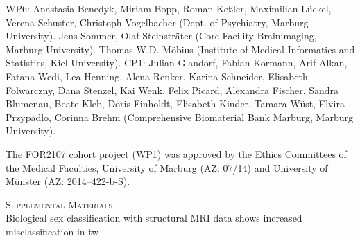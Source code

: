 \documentclass{article}
\begin{document}
    WP6: Anastasia Benedyk, Miriam Bopp, Roman Keßler, Maximilian Lückel, Verena Schuster, Christoph Vogelbacher (Dept. of Psychiatry, Marburg University). Jens Sommer, Olaf Steinsträter (Core-Facility Brainimaging, Marburg University). Thomas W.D. Möbius (Institute of Medical Informatics and Statistics, Kiel University).
    CP1: Julian Glandorf, Fabian Kormann, Arif Alkan, Fatana Wedi, Lea Henning, Alena Renker, Karina Schneider, Elisabeth Folwarczny, Dana Stenzel, Kai Wenk, Felix Picard, Alexandra Fischer, Sandra Blumenau, Beate Kleb, Doris Finholdt, Elisabeth Kinder, Tamara Wüst, Elvira Przypadlo, Corinna Brehm (Comprehensive Biomaterial Bank Marburg, Marburg University).

    The FOR2107 cohort project (WP1) was approved by the Ethics Committees of the Medical Faculties, University of Marburg (AZ: 07/14) and University of Münster (AZ: 2014--422-b-S).


    
    

    \newpage
    \appendix


    \begin{center}
        \LARGE{\textsc{Supplemental Materials}} \\ \Large{Biological sex classification with structural MRI data shows increased misclassification in \acl{tw}}
    \end{center}

    \setcounter{equation}{1}
    \setcounter{figure}{0}
    \setcounter{table}{0}
    \setcounter{page}{1}

    \renewcommand\thefigure{\thesection.\arabic{figure}}
    \renewcommand\thetable{\thesection.\arabic{table}}
\end{document}
